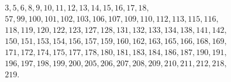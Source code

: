 \[
\begin{gathered}
3,5,6,8,9,10,11,12,13,14,15,16,17,18,\\
57,99,100,101,102,103,106,107,109,110,112,113,115,116,\\
118,119,120,122,123,127,128,131,132,133,134,138,141,142,\\
150,151,153,154,156,157,159,160,162,163,165,166,168,169,\\
171,172,174,175,177,178,180,181,183,184,186,187,190,191,\\
196,197,198,199,200,205,206,207,208,209,210,211,212,218,\\
219.
\end{gathered}
\]
